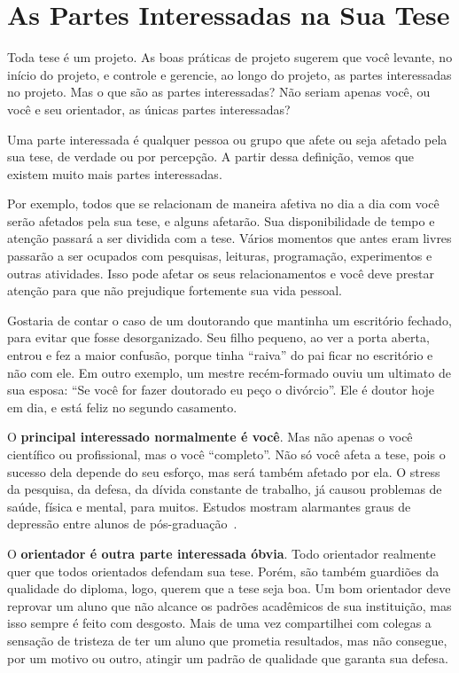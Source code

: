 \chapter{As Partes Interessadas na Sua Tese}

Toda tese é um projeto. As boas práticas de projeto sugerem que você levante, no início do projeto, e controle e gerencie, ao longo do projeto, as partes interessadas no projeto.
Mas o que são as partes interessadas? Não seriam apenas você, ou você e seu orientador, as únicas partes interessadas?

Uma parte interessada é qualquer pessoa ou grupo que afete ou seja afetado pela sua tese, de verdade ou por percepção. A partir dessa definição, vemos que existem muito mais partes interessadas.

Por exemplo, todos que se relacionam de maneira afetiva no dia a dia com você serão afetados pela sua tese, e alguns afetarão. 
Sua disponibilidade de tempo e atenção passará a ser dividida com a tese. 
Vários momentos que antes eram livres passarão a ser ocupados com pesquisas, leituras, programação, experimentos e outras atividades. 
Isso pode afetar os seus relacionamentos e você deve prestar atenção para que não prejudique fortemente sua vida pessoal.

Gostaria de contar o caso de um doutorando que mantinha um escritório fechado, para evitar que fosse desorganizado. 
Seu filho pequeno, ao ver a porta aberta, entrou e fez a maior confusão, porque tinha ``raiva'' do pai ficar no escritório e não com ele. Em outro exemplo, um mestre recém-formado ouviu um ultimato de sua esposa: ``Se você for fazer doutorado eu peço o divórcio''. Ele é doutor hoje em dia, e está feliz no segundo casamento.

O \textbf{principal interessado normalmente é você}. Mas não apenas o você científico ou profissional, mas o você ``completo''. Não só você afeta a tese, pois o sucesso dela depende do seu esforço, mas será também afetado por ela. O stress da pesquisa, da defesa, da dívida constante de trabalho, já causou problemas de saúde, física e mental, para muitos. Estudos mostram alarmantes  graus de depressão entre alunos de pós-graduação~\citep{walker2015}.

O \textbf{orientador é outra parte interessada óbvia}. Todo orientador realmente quer que todos orientados defendam sua tese. Porém, são também guardiões da qualidade do diploma, logo, querem que a tese seja boa. Um bom orientador deve reprovar um aluno que não alcance os padrões acadêmicos de sua instituição, mas isso sempre é feito com desgosto. Mais de uma vez compartilhei com colegas a sensação de tristeza de ter um aluno que prometia resultados, mas não consegue, por um motivo ou outro, atingir um padrão de qualidade que garanta sua defesa.

